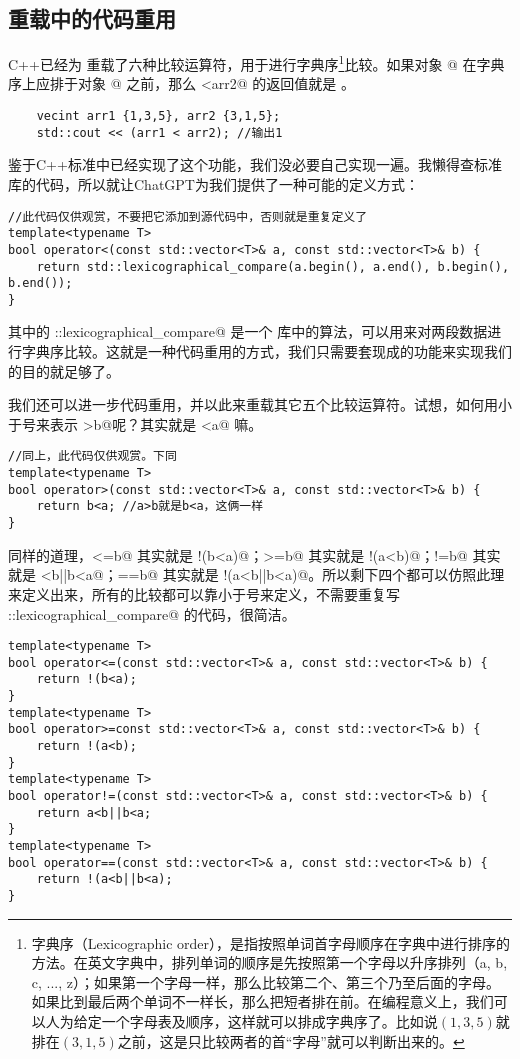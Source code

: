 \subsection*{重载中的代码重用}
C++已经为 \lstinline@vecint@ 重载了六种比较运算符，用于进行字典序\footnote{字典序（Lexicographic order），是指按照单词首字母顺序在字典中进行排序的方法。在英文字典中，排列单词的顺序是先按照第一个字母以升序排列（a, b, c, ..., z）；如果第一个字母一样，那么比较第二个、第三个乃至后面的字母。如果比到最后两个单词不一样长，那么把短者排在前。在编程意义上，我们可以人为给定一个字母表及顺序，这样就可以排成字典序了。比如说$(1,3,5)$就排在$(3,1,5)$之前，这是只比较两者的首``字母''就可以判断出来的。}比较。如果对象 @ 在字典序上应排于对象 @ 之前，那么 <arr2@ 的返回值就是 \lstinline@true@。
\begin{lstlisting}
    vecint arr1 {1,3,5}, arr2 {3,1,5};
    std::cout << (arr1 < arr2); //输出1
\end{lstlisting}
鉴于C++标准中已经实现了这个功能，我们没必要自己实现一遍。我懒得查标准库的代码，所以就让ChatGPT为我们提供了一种可能的定义方式：
\begin{lstlisting}
//此代码仅供观赏，不要把它添加到源代码中，否则就是重复定义了
template<typename T>
bool operator<(const std::vector<T>& a, const std::vector<T>& b) {
    return std::lexicographical_compare(a.begin(), a.end(), b.begin(), b.end());
}
\end{lstlisting}\par
其中的 \lstinline@std::lexicographical_compare@ 是一个 \lstinline@algorithm@ 库中的算法，可以用来对两段数据进行字典序比较。这就是一种代码重用的方式，我们只需要套现成的功能来实现我们的目的就足够了。\par
我们还可以进一步代码重用，并以此来重载其它五个比较运算符。试想，如何用小于号来表示 \lstinline@a>b@呢？其实就是 \lstinline@b<a@ 嘛。
\begin{lstlisting}
//同上，此代码仅供观赏。下同
template<typename T>
bool operator>(const std::vector<T>& a, const std::vector<T>& b) {
    return b<a; //a>b就是b<a，这俩一样
}
\end{lstlisting}
同样的道理，\lstinline@a<=b@ 其实就是 \lstinline@!(b<a)@；\lstinline@a>=b@ 其实就是 \lstinline@!(a<b)@；\lstinline@a!=b@ 其实就是 \lstinline@a<b||b<a@；\lstinline@a==b@ 其实就是 \lstinline@!(a<b||b<a)@。所以剩下四个都可以仿照此理来定义出来，所有的比较都可以靠小于号来定义，不需要重复写 \lstinline@std::lexicographical_compare@ 的代码，很简洁。
\begin{lstlisting}
template<typename T>
bool operator<=(const std::vector<T>& a, const std::vector<T>& b) {
    return !(b<a);
}
template<typename T>
bool operator>=const std::vector<T>& a, const std::vector<T>& b) {
    return !(a<b);
}
template<typename T>
bool operator!=(const std::vector<T>& a, const std::vector<T>& b) {
    return a<b||b<a;
}
template<typename T>
bool operator==(const std::vector<T>& a, const std::vector<T>& b) {
    return !(a<b||b<a);
}
\end{lstlisting}\par
